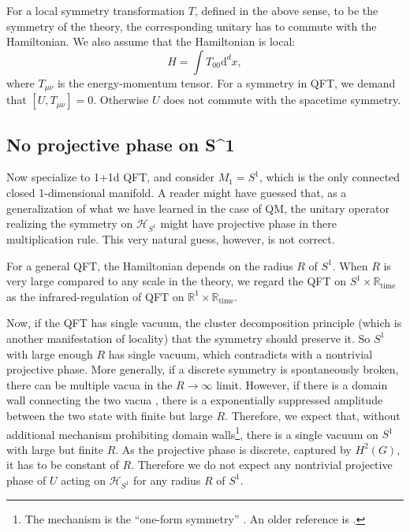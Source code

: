 \documentclass[
]{scrartcl}
\numberwithin{equation}{section}
\theoremstyle{definition}
\theoremstyle{definition}
\theoremstyle{definition}
\theoremstyle{definition}
\theoremstyle{remark}
\begin{document}
For a local symmetry transformation \(T\), defined in the above sense, to be the symmetry of the theory, the corresponding unitary has to commute with the Hamiltonian.
We also assume that the Hamiltonian is local:
\begin{equation}
    \label{eq:localHam}
    H = \int T_{00} \mathrm{d}^dx,
\end{equation}
where \(T_{\mu\nu}\) is the energy-momentum tensor.
For a symmetry in QFT, we demand that \([U,T_{\mu\nu}] = 0\). Otherwise \(U\) does not commute with the spacetime symmetry.

\hypertarget{noproj}{%
\subsection{No projective phase on S\^{}1}\label{noproj}}

Now specialize to 1+1d QFT, and consider \(M_1 = S^1\), which is the only connected closed 1-dimensional manifold.
A reader might have guessed that, as a generalization of what we have learned in the case of QM, the unitary operator realizing the symmetry on \(\mathcal{H}_{S^1}\) might have projective phase in there multiplication rule.
This very natural guess, however, is not correct.

For a general QFT, the Hamiltonian depends on the radius \(R\) of \(S^1\).
When \(R\) is very large compared to any scale in the theory, we regard the QFT on \(S^1\times \mathbb{R}_\text{time}\) as the infrared-regulation of QFT on \(\mathbb{R}^1\times \mathbb{R}_\text{time}\).

Now, if the QFT has single vacuum, the cluster decomposition principle (which is another manifestation of locality) that the symmetry should preserve it. So \(S^1\) with large enough \(R\) has single vacuum, which contradicts with a nontrivial projective phase.
More generally, if a discrete symmetry is spontaneously broken,
there can be multiple vacua in the \(R\to \infty\) limit.
However, if there is a domain wall connecting the two vacua , there is a exponentially suppressed
amplitude between the two state with finite but large \(R\).
Therefore, we expect that, without additional mechanism prohibiting domain walls\footnote{The mechanism is the ``one-form symmetry'' \autocite{Komargodski:2020mxz}. An older reference is \autocite{Hellerman:2006zs}.}, there is a single vacuum on \(S^1\) with large but finite \(R\).
As the projective phase is discrete, captured by \(H^2(G)\), it has to be constant of \(R\). Therefore we do not expect any nontrivial projective phase of \(U\) acting on \(\mathcal{H}_{S^1}\) for any radius \(R\) of \(S^1\).
\end{document}
